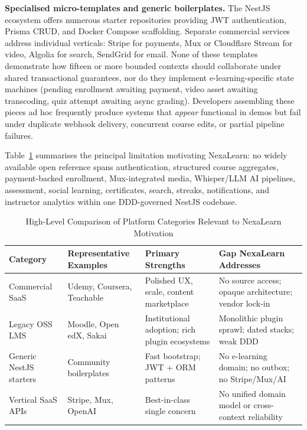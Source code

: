 \textbf{Specialised micro-templates and generic boilerplates.} The NestJS ecosystem offers numerous starter repositories providing JWT authentication, Prisma CRUD, and Docker Compose scaffolding. Separate commercial services address individual verticals: Stripe for payments, Mux or Cloudflare Stream for video, Algolia for search, SendGrid for email. None of these templates demonstrate how fifteen or more bounded contexts should collaborate under shared transactional guarantees, nor do they implement e-learning-specific state machines (pending enrollment awaiting payment, video asset awaiting transcoding, quiz attempt awaiting async grading). Developers assembling these pieces ad hoc frequently produce systems that \textit{appear} functional in demos but fail under duplicate webhook delivery, concurrent course edits, or partial pipeline failures.

Table~\ref{tab:platform-comparison-intro} summarises the principal limitation motivating NexaLearn: no widely available open reference spans authentication, structured course aggregates, payment-backed enrollment, Mux-integrated media, Whisper/LLM AI pipelines, assessment, social learning, certificates, search, streaks, notifications, and instructor analytics within one DDD-governed NestJS codebase.

\begin{table}[H]
  \centering
  \caption{High-Level Comparison of Platform Categories Relevant to NexaLearn Motivation}
  \label{tab:platform-comparison-intro}
  \small
  \begin{tabular}{@{}p{2.8cm} p{3.2cm} p{3.5cm} p{3.8cm}@{}}
    \toprule
    \textbf{Category} & \textbf{Representative Examples} & \textbf{Primary Strengths} & \textbf{Gap NexaLearn Addresses} \\
    \midrule
    Commercial SaaS &
    Udemy, Coursera, Teachable &
    Polished UX, scale, content marketplace &
    No source access; opaque architecture; vendor lock-in \\
    \addlinespace
    Legacy OSS LMS &
    Moodle, Open edX, Sakai &
    Institutional adoption; rich plugin ecosystems &
    Monolithic plugin sprawl; dated stacks; weak DDD \\
    \addlinespace
    Generic NestJS starters &
    Community boilerplates &
    Fast bootstrap; JWT + ORM patterns &
    No e-learning domain; no outbox; no Stripe/Mux/AI \\
    \addlinespace
    Vertical SaaS APIs &
    Stripe, Mux, OpenAI &
    Best-in-class single concern &
    No unified domain model or cross-context reliability \\
    \bottomrule
  \end{tabular}
\end{table}

